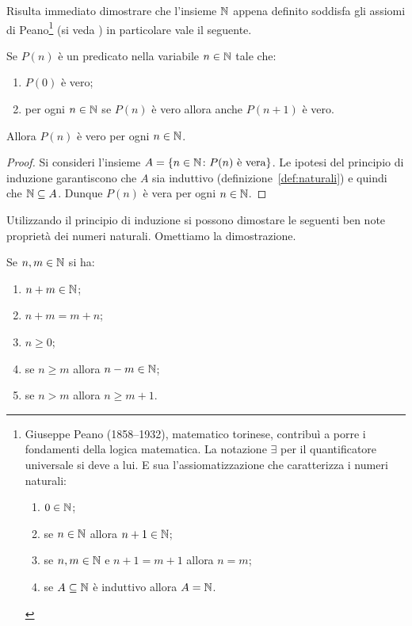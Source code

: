 Risulta immediato dimostrare che l'insieme $\mathbb N$ appena definito
soddisfa gli assiomi di Peano\footnote{%
Giuseppe Peano (1858--1932), matematico torinese, contribuì a porre 
i fondamenti della logica matematica. 
La notazione $\exists$ per il quantificatore universale si deve a lui.
E sua l'assiomatizzazione che caratterizza i numeri naturali:
\begin{enumerate}
  \item $0\in \mathbb N$;
  \item se $n\in \mathbb N$ allora $n+1\in \mathbb N$;
  \item se $n,m\in\mathbb N$ e $n+1=m+1$ allora $n=m$;
  \item se $A\subseteq \mathbb N$ è induttivo allora $A=\mathbb N$.
\end{enumerate}
} (si veda \cite{appunti_logica})
in particolare vale il seguente. 

\begin{theorem}
Se $P(n)$ è un predicato nella variabile $n\in \mathbb N$ tale che:
\begin{enumerate}
\item $P(0)$ è vero;
\item per ogni $n\in \mathbb N$ se $P(n)$ è vero allora anche $P(n+1)$ è vero.
\end{enumerate}
Allora $P(n)$ è vero per ogni $n\in \mathbb N$.
\end{theorem}
%
\begin{proof}
Si consideri l'insieme $A = {\left\{ n \in \mathbb N\colon P(n) \text{ è vera} \right\}}$.
Le ipotesi del principio di induzione garantiscono che $A$ sia induttivo
(definizione~\ref{def:naturali})
e quindi che $\mathbb N \subseteq A$. Dunque $P(n)$ è vera per ogni $n\in \mathbb N$.
\end{proof}

Utilizzando il principio di induzione si possono dimostare le seguenti 
ben note proprietà dei numeri naturali. Omettiamo la dimostrazione.
\begin{theorem}
  Se $n,m\in \mathbb N$ si ha:
  \begin{enumerate}
    \item $n+m\in \mathbb N$;
    \item $n+m = m+n$;
    \item $n\ge 0$;
    \item se $n\ge m$ allora $n-m\in \mathbb N$;
    \item se $n>m$ allora $n\ge m+1$.
  \end{enumerate}
\end{theorem}

